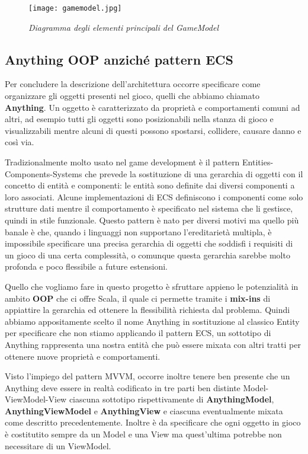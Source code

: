 \begin{figure}[!hbt]
    \centering
    \texttt{[image: gamemodel.jpg]}
    \caption{\textit{Diagramma degli elementi principali del GameModel}} 
\end{figure}

\subsection{Anything OOP anziché pattern ECS}
Per concludere la descrizione dell'architettura occorre specificare come organizzare gli oggetti presenti nel gioco, quelli che abbiamo chiamato \textbf{Anything}.
Un oggetto è caratterizzato da proprietà e comportamenti comuni ad altri, ad esempio tutti gli oggetti sono posizionabili nella stanza di gioco e visualizzabili mentre alcuni di questi possono spostarsi, collidere, causare danno e così via.

Tradizionalmente molto usato nel game development è il pattern Entities-Components-Systems che prevede la sostituzione di una gerarchia di oggetti con il concetto di entità e componenti: le entità sono definite dai diversi componenti a loro associati. 
Alcune implementazioni di ECS definiscono i componenti come solo strutture dati mentre il comportamento è specificato nel sistema che li gestisce, quindi in stile funzionale. 
Questo pattern è nato per diversi motivi ma quello più banale è che, quando i linguaggi non supportano l'ereditarietà multipla, è impossibile specificare una precisa gerarchia di oggetti che soddisfi i requisiti di un gioco di una certa complessità, o comunque questa gerarchia sarebbe molto profonda e poco flessibile a future estensioni.

Quello che vogliamo fare in questo progetto è sfruttare appieno le potenzialità in ambito \textbf{OOP} che ci offre Scala, il quale ci permette tramite i \textbf{mix-ins} di appiattire la gerarchia ed ottenere la flessibilità richiesta dal problema.
Quindi abbiamo appositamente scelto il nome Anything in sostituzione al classico Entity per specificare che non stiamo applicando il pattern ECS, un sottotipo di Anything rappresenta una nostra entità che può essere mixata con altri tratti per ottenere nuove proprietà e comportamenti. 

Visto l'impiego del pattern MVVM, occorre inoltre tenere ben presente che un Anything deve essere in realtà codificato in tre parti ben distinte Model-ViewModel-View ciascuna sottotipo rispettivamente di \textbf{AnythingModel}, \textbf{AnythingViewModel} e \textbf{AnythingView} e ciascuna eventualmente mixata come descritto precedentemente. 
Inoltre è da specificare che ogni oggetto in gioco è costitutito sempre da un Model e una View ma quest'ultima potrebbe non necessitare di un ViewModel.

